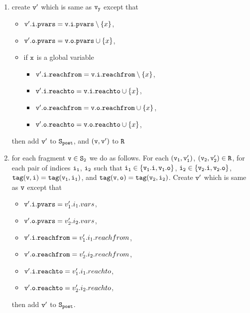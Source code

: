\begin{itemize}
\begin{enumerate}
\item create $\tt v'$ which is same as $\tt v_y$ except that
\begin{itemize}
\item $\mathtt{v}'.\mathtt{i}.\mathtt{pvars} = \mathtt{v}.\mathtt{i}.\mathtt{pvars} \setminus \left\{x\right\}$,
\item $\mathtt{v}'.\mathtt{o}.\mathtt{pvars} = \mathtt{v}.\mathtt{o}.\mathtt{pvars} \cup \left\{x\right\}$,
\item if $\tt x$ is a global variable
\begin{itemize}
\item $\mathtt{v}'.\mathtt{i}.\mathtt{reachfrom} = \mathtt{v}.\mathtt{i}.\mathtt{reachfrom} \setminus \left\{x\right\}$,
\item $\mathtt{v}'.\mathtt{i}.\mathtt{reachto} = \mathtt{v}.\mathtt{i}.\mathtt{reachto} \cup \left\{x\right\}$,
 \item $\mathtt{v}'.\mathtt{o}.\mathtt{reachfrom} = \mathtt{v}.\mathtt{o}.\mathtt{reachfrom} \cup \left\{x\right\}$,
 \item $\mathtt{v}'.\mathtt{o}.\mathtt{reachto} = \mathtt{v}.\mathtt{o}.\mathtt{reachto} \cup \left\{x\right\}$,
\end{itemize}
\end{itemize}
then add $\tt v'$ to $\tt S_{post}$, and $\tt (v,v')$ to $\tt R$
%

\item for each fragment $\tt v \in S_2$ we do as follows. For each $\tt (v_1,v_1')$, $\tt (v_2,v_2') \in R$, for each pair of indices $\tt i_1$, $\tt i_2$ such that $\tt i_1 \in \{v_1.i, v_1.o\}$, $\tt i_2 \in \{v_2.i, v_2.o\}$, $\tt tag(v,i) = tag(v_1, i_1)$, and $\tt tag(v,o) = tag(v_2, i_2)$. Create $\tt v'$ which is same as $\tt v$ except that 
\begin{itemize}
\item $\mathtt{v}'.\mathtt{i}.\mathtt{pvars} = v_1'.i_1.vars$,
\item $\mathtt{v}'.\mathtt{o}.\mathtt{pvars} = v_2'.i_2.vars$,

\item $\mathtt{v}'.\mathtt{i}.\mathtt{reachfrom} = v_1'.i_1.reachfrom$,
\item $\mathtt{v}'.\mathtt{o}.\mathtt{reachfrom} = v_2'.i_2.reachfrom$,
\item $\mathtt{v}'.\mathtt{i}.\mathtt{reachto} = v_1'.i_1.reachto$,
\item $\mathtt{v}'.\mathtt{o}.\mathtt{reachto} = v_2'.i_2.reachto$,
\end{itemize} then add $\tt v'$ to $\tt S_{post}$. 
\end{enumerate}	





\end{itemize}
